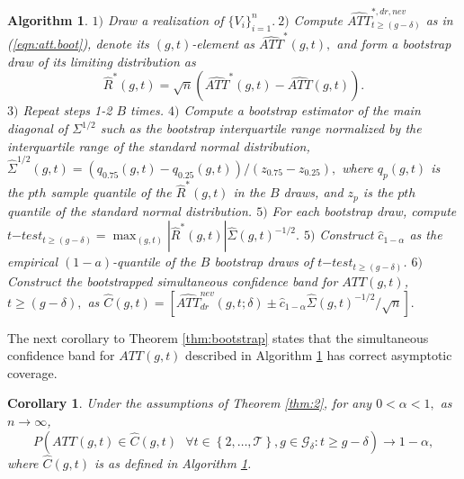 \documentclass[11pt]{article}%
\theoremstyle{plain}
\newtheorem{algorithm}{Algorithm}
\newtheorem{corollary}{Corollary}
\numberwithin{sassumption}{section}
\numberwithin{equation}{section}
\begin{document}
\begin{algorithm}
\label{alg:boot1} $1)$ Draw a realization of $\{V_{i}\}_{i=1}^{n}.~2)$ Compute
$\widehat{ATT}_{t\geq\left(  g-\delta\right)  }^{\ast,dr,nev}$ as in
(\ref{eqn:att.boot}), denote its $\left(  g,t\right)  $-element as
$\widehat{ATT}^{\ast}\left(  g,t\right)  ,$ and form a bootstrap draw of its
limiting distribution as
\[
\hat{R}^{\ast}\left(  g,t\right)  =\sqrt{n}\left(  \widehat{ATT}^{\ast}\left(
g,t\right)  -\widehat{ATT}\left(  g,t\right)  \right)  .
\]
$3)$ Repeat steps 1-2 $B$ times. $4)$ Compute a bootstrap estimator of the
main diagonal of $\Sigma^{1/2}$ such as the bootstrap interquartile range
normalized by the interquartile range of the standard normal distribution,
$\widehat{\Sigma}^{1/2}\left(  g,t\right)  =\left(  q_{0.75}\left(
g,t\right)  -q_{0.25}\left(  g,t\right)  \right)  /\left(  z_{0.75}%
-z_{0.25}\right)  ,$ where $q_{p}\left(  g,t\right)  $ is the $pth$ sample
quantile of the $\hat{R}^{\ast}\left(  g,t\right)  $ in the $B$ draws, and
$z_{p}$ is the $pth$ quantile of the standard normal distribution. $5)$ For
each bootstrap draw, compute $t\mathit{-}test_{t\geq\left(  g-\delta\right)
}=\max_{\left(  g,t\right)  }\left\vert \hat{R}^{\ast}\left(  g,t\right)
\right\vert \widehat{\Sigma}\left(  g,t\right)  ^{-1/2}.$ $5)$ Construct
$\widehat{c}_{1-\alpha}$ as the empirical $\left(  1-a\right)  $-quantile of
the $B$ bootstrap draws of $t\mathit{-}test_{t\geq\left(  g-\delta\right)  }$.
$6)$ Construct the bootstrapped simultaneous confidence band for $ATT\left(
g,t\right)  $, $t\geq\left(  g-\delta\right)  ,$ as $\widehat{C}\left(
g,t\right)  =[\widehat{ATT}_{dr}^{nev}\left(  g,t;\delta\right)
\pm\widehat{c}_{1-\alpha}\widehat{\Sigma}\left(  g,t\right)  ^{-1/2}/\sqrt
{n}].$
\end{algorithm}

The next corollary to Theorem \ref{thm:bootstrap} states that the simultaneous
confidence band for $ATT\left(  g,t\right)  $ described in Algorithm
\ref{alg:boot1} has correct asymptotic coverage.

\begin{corollary}
\label{cor:boot}Under the assumptions of Theorem \ref{thm:2}, for any
$0<\alpha<1,$ as $n\rightarrow\infty$,
\[
P\left(  ATT\left(  g,t\right)  \in\widehat{C}\left(  g,t\right)  ~~~\forall
t\in\left\{  2,\dots,\mathcal{T}\right\}  ,g\in\mathcal{G}_{\delta}:t\geq
g-\delta\right)  \rightarrow
1-\alpha,
\]
where $\widehat{C}\left(  g,t\right)  $ is as defined in Algorithm
\ref{alg:boot1}.
\end{corollary}
\end{document}
